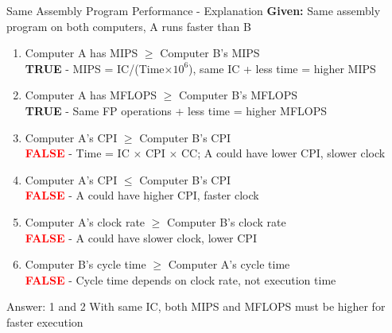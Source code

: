 \documentclass[aspectratio=169,12pt]{beamer}
\begin{document}
\begin{frame}{Same Assembly Program Performance - Explanation}
\scriptsize
\textbf{Given:} Same assembly program on both computers, A runs faster than B

\begin{enumerate}
    \scriptsize
    \item Computer A has MIPS $\geq$ Computer B's MIPS\\
    \pause
    \hspace{1em}\colorbox{green!20}{\textcolor{green!50!black}{\textbf{TRUE}}} - MIPS = IC/(Time$\times 10^6$), same IC + less time = higher MIPS
    \pause
    
    \item Computer A has MFLOPS $\geq$ Computer B's MFLOPS\\
    \pause
    \hspace{1em}\colorbox{green!20}{\textcolor{green!50!black}{\textbf{TRUE}}} - Same FP operations + less time = higher MFLOPS
    \pause
    
    \item Computer A's CPI $\geq$ Computer B's CPI\\
    \pause
    \hspace{1em}\colorbox{red!20}{\textcolor{red}{\textbf{FALSE}}} - Time = IC $\times$ CPI $\times$ CC; A could have lower CPI, slower clock
    \pause
    
    \item Computer A's CPI $\leq$ Computer B's CPI\\
    \pause
    \hspace{1em}\colorbox{red!20}{\textcolor{red}{\textbf{FALSE}}} - A could have higher CPI, faster clock
    \pause
    
    \item Computer A's clock rate $\geq$ Computer B's clock rate\\
    \pause
    \hspace{1em}\colorbox{red!20}{\textcolor{red}{\textbf{FALSE}}} - A could have slower clock, lower CPI
    \pause
    
    \item Computer B's cycle time $\geq$ Computer A's cycle time\\
    \pause
    \hspace{1em}\colorbox{red!20}{\textcolor{red}{\textbf{FALSE}}} - Cycle time depends on clock rate, not execution time
\end{enumerate}

\pause
\begin{alertblock}{Answer: 1 and 2}
With same IC, both MIPS and MFLOPS must be higher for faster execution
\end{alertblock}
\end{frame}
\end{document}

